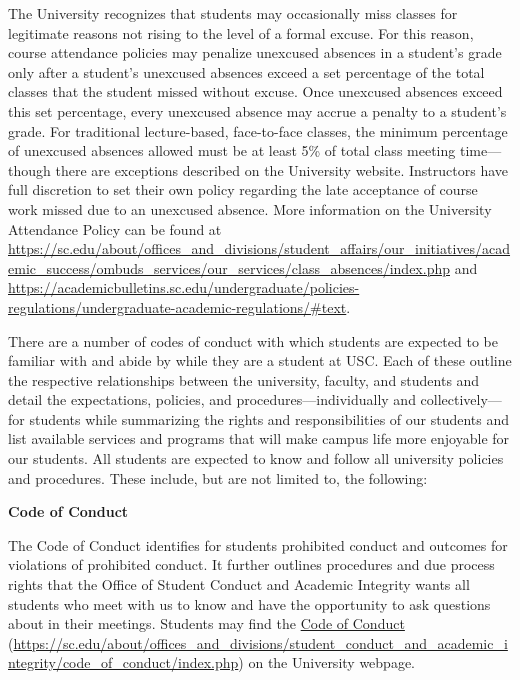 \documentclass[11pt,letterpaper]{article}
\begin{document}
The University recognizes that students may occasionally miss classes for legitimate reasons not rising to the level of a formal excuse. For this reason, course attendance policies may penalize unexcused absences in a student's grade only after a student's unexcused absences exceed a set percentage of the total classes that the student missed without excuse. Once unexcused absences exceed this set percentage, every unexcused absence may accrue a penalty to a student’s grade. For traditional lecture-based, face-to-face classes, the minimum percentage of unexcused absences allowed must be at least 5\% of total class meeting time---though there are exceptions described on the University website. Instructors have full discretion to set their own policy regarding the late acceptance of course work missed due to an unexcused absence. More information on the University Attendance Policy can be found at \url{https://sc.edu/about/offices_and_divisions/student_affairs/our_initiatives/academic_success/ombuds_services/our_services/class_absences/index.php} and \url{https://academicbulletins.sc.edu/undergraduate/policies-regulations/undergraduate-academic-regulations/\#text}. 
\pspace




There are a number of codes of conduct with which students are expected to be familiar with and abide by while they are a student at USC. Each of these outline the respective relationships between the university, faculty, and students and detail the expectations, policies, and procedures---individually and collectively---for students while summarizing the rights and responsibilities of our students and list available services and programs that will make campus life more enjoyable for our students. All students are expected to know and follow all university policies and procedures. These include, but are not limited to, the following: \pspace

{\bfseries Code of Conduct} \par
The Code of Conduct identifies for students prohibited conduct and outcomes for violations of prohibited conduct. It further outlines procedures and due process rights that the Office of Student Conduct and Academic Integrity wants all students who meet with us to know and have the opportunity to ask questions about in their meetings. Students may find the \href{https://sc.edu/about/offices\_and\_divisions/student\_conduct\_and\_academic\_integrity/code\_of\_conduct/index.php}{Code of Conduct} (\url{https://sc.edu/about/offices\_and\_divisions/student\_conduct\_and\_academic\_integrity/code\_of\_conduct/index.php}) on the University webpage. \pspace
\end{document}
